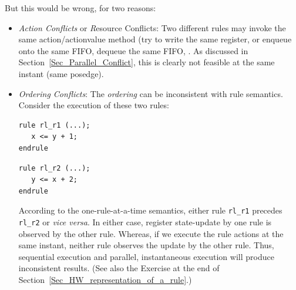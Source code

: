 But this would be wrong, for two reasons:

\begin{itemize}

 \item \emph{Action Conflicts} or {\emph Resource Conflicts}: Two
       different rules may invoke the same action/actionvalue method
       (try to write the same register, or enqueue onto the same FIFO,
       dequeue the same FIFO, {\etc}.  As discussed in
       Section~\ref{Sec_Parallel_Conflict}, this is clearly not
       feasible at the same instant (same posedge).

 \item \emph{Ordering Conflicts}: The \emph{ordering} can be
       inconsistent with rule semantics.  Consider the execution of
       these two rules:

       \begin{center}
       \begin{minipage}{2.5in}
        {\footnotesize
        \begin{Verbatim}[frame=single, label=BSV]
rule rl_r1 (...);
   x <= y + 1;
endrule
        \end{Verbatim}
        }
       \end{minipage}
       \hmm
       \begin{minipage}{2.5in}
        {\footnotesize
        \begin{Verbatim}[frame=single,label=BSV]
rule rl_r2 (...);
   y <= x + 2;
endrule
        \end{Verbatim}
        }
       \end{minipage}
       \end{center}

       According to the one-rule-at-a-time semantics, either rule
       \verb|rl_r1| precedes \verb|rl_r2| or \emph{vice versa}.  In
       either case, register state-update by one rule is observed by
       the other rule.  Whereas, if we execute the rule actions at the
       same instant, neither rule observes the update by the other
       rule.  Thus, sequential execution and parallel, instantaneous
       execution will produce inconsistent results. (See also the
       Exercise at the end of
       Section~\ref{Sec_HW_representation_of_a_rule}.)

\end{itemize}


